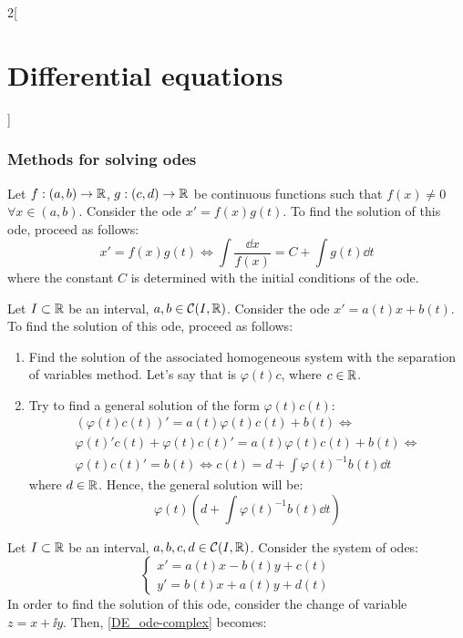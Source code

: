 \documentclass[../../../main.tex]{subfiles}
\begin{document}
\begin{multicols}{2}[\section{Differential equations}]
  \subsubsection{Methods for solving odes}
  \begin{method}
    Let $f:(a,b)\rightarrow\mathbb{R}$, $g:(c,d)\rightarrow\mathbb{R}$ be continuous functions such that $f(x)\ne 0$ $\forall x\in (a,b)$. Consider the ode $x'=f(x)g(t)$. To find the solution of this ode, proceed as follows:
    $$x'=f(x)g(t)\iff \int\frac{\dd x}{f(x)}=C+\int g(t)\dd t$$ where the constant $C$ is determined with the initial conditions of the ode.
  \end{method}
  \begin{method}
    Let $I\subset \mathbb{R}$ be an interval, $a,b\in\mathcal{C}(I,\mathbb{R})$. Consider the ode $x'=a(t)x+b(t)$. To find the solution of this ode, proceed as follows:
    \begin{enumerate}
      \item Find the solution of the associated homogeneous system with the separation of variables method. Let's say that is $\varphi(t)c$, where $c\in\mathbb{R}$.
      \item Try to find a general solution of the form $\varphi(t)c(t)$:
            \begin{multline*}
              \left(\varphi(t)c(t)\right)'=a(t)\varphi(t)c(t)+b(t)\iff\\\varphi(t)'c(t)+\varphi(t)c(t)'=a(t)\varphi(t)c(t)+b(t)\iff\\\varphi(t)c(t)'=b(t)\iff c(t)=d+\int\varphi(t)^{-1}b(t)\dd t
            \end{multline*}
            where $d\in\mathbb{R}$. Hence, the general solution will be: $$\varphi(t)\left(d+\int\varphi(t)^{-1}b(t)\dd t\right)$$
    \end{enumerate}
  \end{method}
  \begin{method}
    Let $I\subset \mathbb{R}$ be an interval, $a,b,c,d\in\mathcal{C}(I,\mathbb{R})$. Consider the system of odes:
    \begin{equation}\label{DE_ode-complex}
      \left\{
      \begin{aligned}
        x'=a(t)x-b(t)y+c(t) \\
        y'=b(t)x+a(t)y+d(t)
      \end{aligned}
      \right.
    \end{equation}
    In order to find the solution of this ode, consider the change of variable $z=x+\ii y$. Then, \cref{DE_ode-complex} becomes:

\end{method}
\end{multicols}
\end{document}
